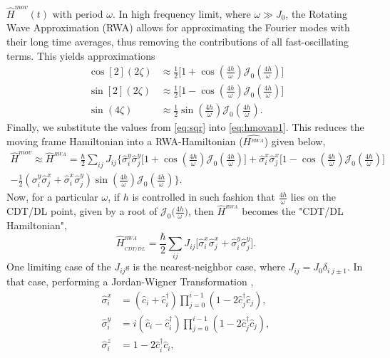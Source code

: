 \documentclass[12pt]{iopart}
\providecommand{\DIFaddtex}[1]{{\protect\color{red}\uwave{#1}}} %
\providecommand{\DIFdeltex}[1]{{}}                      %
\providecommand{\DIFaddbegin}{} %
\providecommand{\DIFaddend}{} %
\providecommand{\DIFdelbegin}{} %
\providecommand{\DIFdelend}{} %
\providecommand{\DIFadd}[1]{\texorpdfstring{\DIFaddtex{#1}}{#1}} %
\providecommand{\DIFdel}[1]{\texorpdfstring{\DIFdeltex{#1}}{}} %
\newcommand{\DIFscaledelfig}{0.5}
\newlength{\DIFdelgraphicswidth} %
\newlength{\DIFdelgraphicsheight} %
\newcommand{\DIFaddincludegraphics}[2][]{{\color{blue}\fbox{\DIFOincludegraphics[#1]{#2}}}} %
\newcommand{\DIFdelincludegraphics}[2][]{%
\sbox{\DIFdelgraphicsbox}{\DIFOincludegraphics[#1]{#2}}%
\settoboxwidth{\DIFdelgraphicswidth}{\DIFdelgraphicsbox} %
\settoboxtotalheight{\DIFdelgraphicsheight}{\DIFdelgraphicsbox} %
\scalebox{\DIFscaledelfig}{%
\parbox[b]{\DIFdelgraphicswidth}{\usebox{\DIFdelgraphicsbox}\\[-\baselineskip] \rule{\DIFdelgraphicswidth}{0em}}\llap{\resizebox{\DIFdelgraphicswidth}{\DIFdelgraphicsheight}{%
\setlength{\unitlength}{\DIFdelgraphicswidth}%
\begin{picture}(1,1)%
\thicklines\linethickness{2pt} %
{\color[rgb]{1,0,0}\put(0,0){\framebox(1,1){}}}%
{\color[rgb]{1,0,0}\put(0,0){\line( 1,1){1}}}%
{\color[rgb]{1,0,0}\put(0,1){\line(1,-1){1}}}%
\end{picture}%
}\hspace*{3pt}}} %
} %
\DeclareRobustCommand{\DIFaddbegin}{\DIFOaddbegin \let\includegraphics\DIFaddincludegraphics} %
\DeclareRobustCommand{\DIFaddend}{\DIFOaddend \let\includegraphics\DIFOincludegraphics} %
\DeclareRobustCommand{\DIFdelbegin}{\DIFOdelbegin \let\includegraphics\DIFdelincludegraphics} %
\DeclareRobustCommand{\DIFdelend}{\DIFOaddend \let\includegraphics\DIFOincludegraphics} %
\begin{document}
$\hat{H}^{mov}(t)$ with period $\omega$. In high frequency limit, where $\omega \gg J_0$, the Rotating Wave Approximation (RWA) allows for approximating the Fourier modes with their long time averages, thus removing the contributions of all fast-oscillating terms. This yields approximations
\begin{align}
\cos[2](2\zeta) &\approx \frac{1}{2} \Bigg[1+ \cos(\frac{4h}{\omega})\mathcal{J}_0\left(\frac{4h}{\omega}\right)\Bigg]\nonumber\\
\sin[2](2\zeta) &\approx \frac{1}{2} \Bigg[1- \cos(\frac{4h}{\omega})\mathcal{J}_0\left(\frac{4h}{\omega}\right)\Bigg]\nonumber\\
\sin(4\zeta)&\approx \frac{1}{2} \sin(\frac{4h}{\omega})\mathcal{J}_0\left(\frac{4h}{\omega}\right).
\label{eq:sqr}
\end{align}
Finally, we substitute the values from \DIFdelbegin \DIFdel{Eq.}\DIFdelend \DIFaddbegin \DIFadd{equation~}\DIFaddend \eqref{eq:sqr} into \DIFdelbegin \DIFdel{Eq.}\DIFdelend \DIFaddbegin \DIFadd{equation~}\DIFaddend \eqref{eq:hmovap1}. This reduces the moving frame Hamiltonian into a RWA-Hamiltonian ($\hat{H^{_{RWA}}}$) given below,
\begin{multline}
    \hat{H}^{mov}\approx \hat{H}^{_{RWA}} = \frac{\hbar}{2}\sum_{ij} J_{ij}  \Bigg\{ \hat{\sigma}^y_i\hat{\sigma}^y_j\Bigg[1+ \cos(\frac{4h}{\omega})\mathcal{J}_0\left(\frac{4h}{\omega}\right)\Bigg] +\hat{\sigma}^x_i\hat{\sigma}^x_j \Bigg[1- \cos(\frac{4h}{\omega})\mathcal{J}_0\left(\frac{4h}{\omega}\right)\Bigg] \\
    - \frac{1}{2} (\sigma^y_i\hat{\sigma}^x_j + \hat{\sigma}^x_i\hat{\sigma}^y_j)\sin(\frac{4h}{\omega})\mathcal{J}_0\left(\frac{4h}{\omega}\right)\Bigg\}.
    \label{eq:hrwa}
\end{multline}
Now, for a particular $\omega$, if $h$ is controlled in such fashion that $\frac{4h}{\omega}$ lies on the CDT/DL point, given by a root of $\mathcal{J}_0\Big(\frac{4h}{\omega}\Big)$, then $\hat{H}^{_{RWA}}$ becomes the "CDT/DL Hamiltonian",
\begin{equation}
\hat{H}^{_{RWA}}_{_{CDT/DL}} = \frac{\hbar}{2}\sum_{ij} J_{ij}  \Big[\hat{\sigma}^x_i\hat{\sigma}^x_j + \hat{\sigma}^y_i\hat{\sigma}^y_j\Big].
\label{eq:hrwa:frz}
\end{equation}	
One limiting case of the $J_{ij}$s is the nearest-neighbor case, where $J_{ij} = J_0 \delta_{i\;j\pm1}$. In that case, performing a Jordan-Wigner Transformation ,
\begin{align}
\hat{\sigma}^x_i &= \left(\hat{c}_i + \hat{c}^\dagger_i\right) \prod_{j=0}^{i-1}\left(1-2\hat{c}^\dagger_j \hat{c}^{\;}_j\right),\nonumber\\
\hat{\sigma}^y_i &= i\left(\hat{c}_i - \hat{c}^\dagger_i\right) \prod_{j=0}^{i-1}\left(1-2\hat{c}^\dagger_j \hat{c}^{\;}_j\right),\nonumber\\
\hat{\sigma}^z_i &= 1-2\hat{c}^\dagger_i\hat{c}^{\;}_i,
\end{align}
\end{document}
